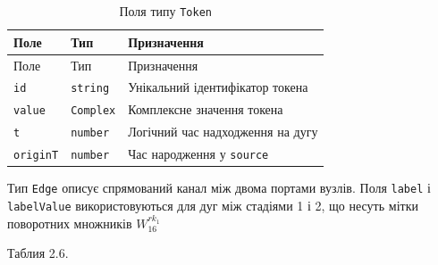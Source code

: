 \documentclass[
]{article}
\begin{document}
\begin{longtable}[]{@{}
  >{\raggedright\arraybackslash}p{}
  >{\raggedright\arraybackslash}p{}
  >{\raggedright\arraybackslash}p{}@{}}
\caption{Поля типу \protect\texttt{Token}}\tabularnewline
\toprule\noalign{}
\begin{minipage}[b]{\linewidth}\raggedright
Поле
\end{minipage} & \begin{minipage}[b]{\linewidth}\raggedright
Тип
\end{minipage} & \begin{minipage}[b]{\linewidth}\raggedright
Призначення
\end{minipage} \\
\midrule\noalign{}
\endfirsthead
\toprule\noalign{}
\begin{minipage}[b]{\linewidth}\raggedright
Поле
\end{minipage} & \begin{minipage}[b]{\linewidth}\raggedright
Тип
\end{minipage} & \begin{minipage}[b]{\linewidth}\raggedright
Призначення
\end{minipage} \\
\midrule\noalign{}
\endhead
\bottomrule\noalign{}
\endlastfoot
\texttt{id} & \texttt{string} & Унікальний ідентифікатор токена \\
\texttt{value} & \texttt{Complex} & Комплексне значення токена \\
\texttt{t} & \texttt{number} & Логічний час надходження на дугу \\
\texttt{originT} & \texttt{number} & Час народження у \texttt{source} \\
\end{longtable}

Тип \texttt{Edge} описує спрямований канал між двома портами вузлів.
Поля \texttt{label} і \texttt{labelValue} використовуються для дуг між
стадіями 1 і 2, що несуть мітки поворотних множників \(W_{16}^{rk_{1}}\)

Таблия 2.6.
\end{document}
